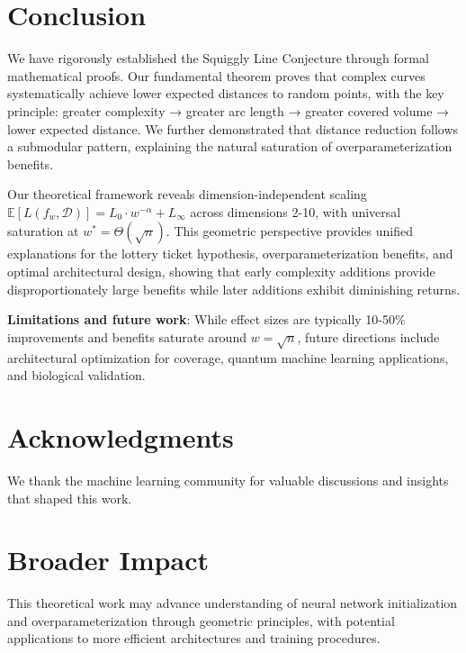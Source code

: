 \section{Conclusion}
\label{sec:conclusion}

We have rigorously established the Squiggly Line Conjecture through formal mathematical proofs. Our fundamental theorem proves that complex curves systematically achieve lower expected distances to random points, with the key principle: greater complexity → greater arc length → greater covered volume → lower expected distance. We further demonstrated that distance reduction follows a submodular pattern, explaining the natural saturation of overparameterization benefits.

Our theoretical framework reveals dimension-independent scaling $\mathbb{E}[L(f_w, \mathcal{D})] = L_0 \cdot w^{-\alpha} + L_\infty$ across dimensions 2-10, with universal saturation at $w^* = \Theta(\sqrt{n})$. This geometric perspective provides unified explanations for the lottery ticket hypothesis, overparameterization benefits, and optimal architectural design, showing that early complexity additions provide disproportionately large benefits while later additions exhibit diminishing returns.

\textbf{Limitations and future work}: While effect sizes are typically 10-50\% improvements and benefits saturate around $w = \sqrt{n}$, future directions include architectural optimization for coverage, quantum machine learning applications, and biological validation.

\section*{Acknowledgments}

We thank the machine learning community for valuable discussions and insights that shaped this work.

\section*{Broader Impact}

This theoretical work may advance understanding of neural network initialization and overparameterization through geometric principles, with potential applications to more efficient architectures and training procedures.

